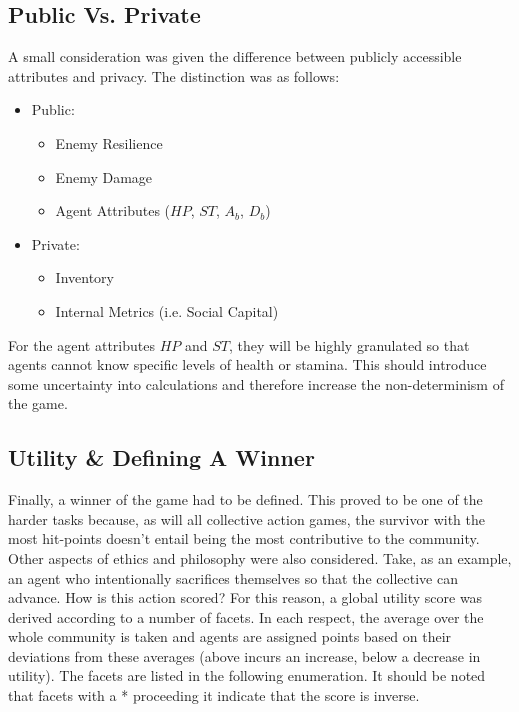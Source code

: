 \subsection{Public Vs. Private}\label{sec:pubpiv}

A small consideration was given the difference between publicly accessible attributes and privacy. The distinction was as follows:

\begin{itemize}
    \item Public:
    \begin{itemize}
        \item Enemy Resilience 
        \item Enemy Damage
        \item Agent Attributes ($HP$, $ST$, $A_b$, $D_b$)
    \end{itemize}
    \item Private:
    \begin{itemize}
        \item Inventory
        \item Internal Metrics (i.e. Social Capital)
    \end{itemize}
\end{itemize}

For the agent attributes $HP$ and $ST$, they will be highly granulated so that agents cannot know specific levels of health or stamina. This should introduce some uncertainty into calculations and therefore increase the non-determinism of the game. 

\subsection{Utility \& Defining A Winner}\label{sec: winner}

Finally, a winner of the game had to be defined. This proved to be one of the harder tasks because, as will all collective action games, the survivor with the most hit-points doesn't entail being the most contributive to the community. Other aspects of ethics and philosophy were also considered. Take, as an example, an agent who intentionally sacrifices themselves so that the collective can advance. How is this action scored? For this reason, a global utility score was derived according to a number of facets. In each respect, the average over the whole community is taken and agents are assigned points based on their deviations from these averages (above incurs an increase, below a decrease in utility). The facets are listed in the following enumeration. It should be noted that facets with a * proceeding it indicate that the score is inverse. 

